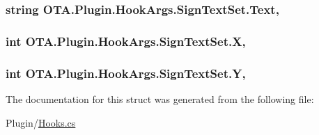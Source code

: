 \subsubsection[{Text}]{\setlength{\rightskip}{0pt plus 5cm}string O\+T\+A.\+Plugin.\+Hook\+Args.\+Sign\+Text\+Set.\+Text\hspace{0.3cm}{\ttfamily [get]}, {\ttfamily [set]}}\label{struct_o_t_a_1_1_plugin_1_1_hook_args_1_1_sign_text_set_a114083f3df5a080712423993b605c0b3}
\hypertarget{struct_o_t_a_1_1_plugin_1_1_hook_args_1_1_sign_text_set_a8e80803b1b4f31427a2d9c15ef0aceaf}{}
\subsubsection[{X}]{\setlength{\rightskip}{0pt plus 5cm}int O\+T\+A.\+Plugin.\+Hook\+Args.\+Sign\+Text\+Set.\+X\hspace{0.3cm}{\ttfamily [get]}, {\ttfamily [set]}}\label{struct_o_t_a_1_1_plugin_1_1_hook_args_1_1_sign_text_set_a8e80803b1b4f31427a2d9c15ef0aceaf}
\hypertarget{struct_o_t_a_1_1_plugin_1_1_hook_args_1_1_sign_text_set_a229a87aad23e7229f9d44680be28207e}{}
\subsubsection[{Y}]{\setlength{\rightskip}{0pt plus 5cm}int O\+T\+A.\+Plugin.\+Hook\+Args.\+Sign\+Text\+Set.\+Y\hspace{0.3cm}{\ttfamily [get]}, {\ttfamily [set]}}\label{struct_o_t_a_1_1_plugin_1_1_hook_args_1_1_sign_text_set_a229a87aad23e7229f9d44680be28207e}


The documentation for this struct was generated from the following file\+:\begin{DoxyCompactItemize}
\item 
Plugin/\hyperlink{_hooks_8cs}{Hooks.\+cs}\end{DoxyCompactItemize}
